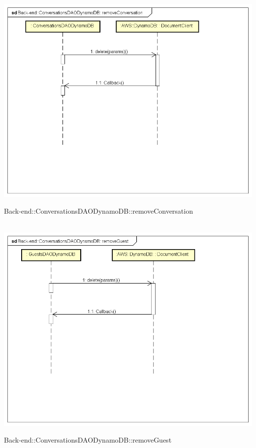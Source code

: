 \\ \includegraphics[width=\textwidth,height=\textheight,keepaspectratio]{images/diagrams/back-end/Ufficial_Backend/Back-end__ConversationsDAODynamoDB__removeConversation.png} 	\caption{Back-end::ConversationsDAODynamoDB::removeConversation}
\\ \includegraphics[width=\textwidth,height=\textheight,keepaspectratio]{images/diagrams/back-end/Ufficial_Backend/Back-end__ConversationsDAODynamoDB__removeGuest.png} 	\caption{Back-end::ConversationsDAODynamoDB::removeGuest}

